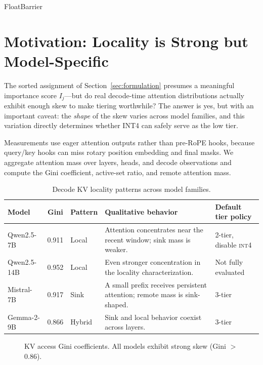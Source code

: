 \documentclass[11pt]{article}
\newcommand{\intiv}{\textsc{int4}}
\theoremstyle{plain}
\theoremstyle{definition}
\begin{document}
FloatBarrier
\section{Motivation: Locality is Strong but Model-Specific}
\label{sec:motivation}

The sorted assignment of Section~\ref{sec:formulation} presumes a meaningful importance score $I_j$---but do real decode-time attention distributions actually exhibit enough skew to make tiering worthwhile?  The answer is yes, but with an important caveat: the \emph{shape} of the skew varies across model families, and this variation directly determines whether INT4 can safely serve as the low tier.

Measurements use eager attention outputs rather than pre-RoPE hooks, because query/key hooks can miss rotary position embedding and final masks.  We aggregate attention mass over layers, heads, and decode observations and compute the Gini coefficient, active-set ratio, and remote attention mass.

\begin{table}[t]
\centering
\caption{Decode KV locality patterns across model families.}
\label{tab:locality}
\begin{tabularx}{\linewidth}{lclYl}
\toprule
Model & Gini & Pattern & Qualitative behavior & Default tier policy \\
\midrule
Qwen2.5-7B & 0.911 & Local & Attention concentrates near the recent window; sink mass is weaker. & 2-tier, disable \intiv{} \\
Qwen2.5-14B & 0.952 & Local & Even stronger concentration in the locality characterization. & Not fully evaluated \\
Mistral-7B & 0.917 & Sink & A small prefix receives persistent attention; remote mass is sink-shaped. & 3-tier \\
Gemma-2-9B & 0.866 & Hybrid & Sink and local behavior coexist across layers. & 3-tier \\
\bottomrule
\end{tabularx}
\end{table}

\begin{figure}[H]
\centering
{}
\caption{KV access Gini coefficients.  All models exhibit strong skew (Gini $>$ 0.86).}
\label{fig:gini}
\end{figure}
\end{document}

